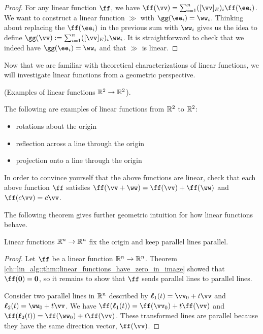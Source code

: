 \begin{proof}
    For any linear function $\ff$, we have $\ff(\vv) = \sum_{i = 1}^n ([\vv]_E)_i \ff(\ee_i)$. We want to construct a linear function $\gg$ with $\gg(\ee_i) = \ww_i$. Thinking about replacing the $\ff(\ee_i)$ in the previous sum with $\ww_i$ gives us the idea to define $\gg(\vv) := \sum_{i = 1}^n ([\vv]_E)_i \ww_i$. It is straightforward to check that we indeed have $\gg(\ee_i) = \ww_i$ and that $\gg$ is linear.
\end{proof}

Now that we are familiar with theoretical characterizations of linear functions, we will investigate linear functions from a geometric perspective.

\begin{remark}
    (Examples of linear functions $\mathbb{R}^2 \rightarrow \mathbb{R}^2$).
    
    The following are examples of linear functions from $\mathbb{R}^2$ to $\mathbb{R}^2$:
    
    \begin{itemize}
        \item rotations about the origin
        \item reflection across a line through the origin
        \item projection onto a line through the origin
    \end{itemize}
    
    In order to convince yourself that the above functions are linear, check that each above function $\ff$ satisfies $\ff(\vv + \ww) = \ff(\vv) + \ff(\ww)$ and $\ff(c \vv) = c \vv$.
\end{remark}

The following theorem gives further geometric intuition for how linear functions behave.

\begin{theorem}
    Linear functions $\mathbb{R}^n \rightarrow \mathbb{R}^n$ fix the origin and keep parallel lines parallel.
\end{theorem}

\begin{proof}
   Let $\ff$ be a linear function $\mathbb{R}^n \rightarrow \mathbb{R}^n$. Theorem \ref{ch::lin_alg::thm::linear_functions_have_zero_in_image} showed that $\ff(\mathbf{0}) = \mathbf{0}$, so it remains to show that $\ff$ sends parallel lines to parallel lines. 
   
   Consider two parallel lines in $\mathbb{R}^n$ described by $\eell_1(t) = \vv_0 + t\vv$ and $\eell_2(t) = \ww_0 + t\vv$. We have $\ff(\eell_1(t)) = \ff(\vv_0) + t \ff(\vv)$ and $\ff(\eell_2(t)) = \ff(\ww_0) + t \ff(\vv)$. These transformed lines are parallel because they have the same direction vector, $\ff(\vv)$.
\end{proof}

